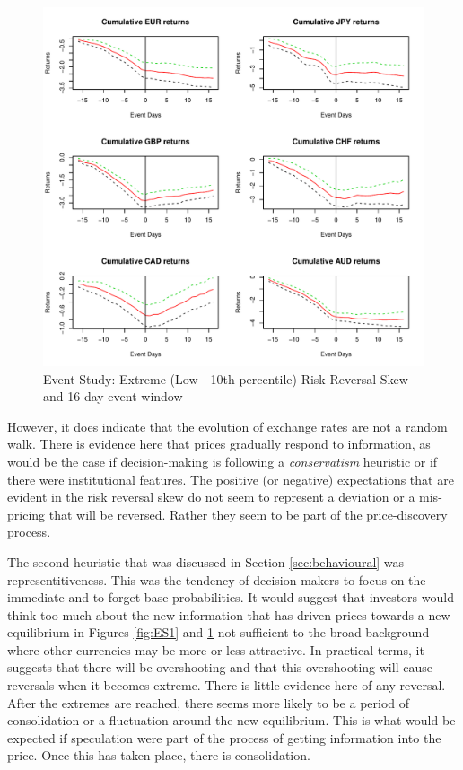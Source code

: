 \documentclass[12pt, a4paper, oneside]{article} %
\begin{document}
\begin{figure}[h!]
\graphicspath{{../Figures/}}
\centering
\caption{Event Study:  Extreme (Low - 10th percentile) Risk Reversal Skew and 16 day event window}
\label{fig:ES2}
\includegraphics[scale=0.8]{RRCum16a}
\end{figure}

However, it does indicate that the evolution of exchange rates are not a random walk.  There is evidence here that prices gradually respond to information, as would be the case if decision-making is following a \emph{conservatism} heuristic or if there were institutional features.  The positive (or negative) expectations that are evident in the risk reversal skew do not seem to represent a deviation or a mis-pricing that will be reversed.  Rather they seem to be part of the price-discovery process.   

The second heuristic that was discussed in Section \ref{sec:behavioural} was representitiveness.  This was the tendency of decision-makers to focus on the immediate and to forget base probabilities.  It would suggest that investors would think too much about the new information that has driven prices towards a new equilibrium in Figures \ref{fig:ES1} and \ref{fig:ES2} not sufficient to the broad background where other currencies may be more or less attractive.  In practical terms, it suggests that there will be overshooting and that this overshooting will cause reversals when it becomes extreme.  There is little evidence here of any reversal.  After the extremes are reached, there seems more likely to be a period of consolidation or a fluctuation around the new equilibrium.  This is what would be expected if speculation were part of the process of getting information into the price. Once this has taken place, there is consolidation. 
 
\end{document}

